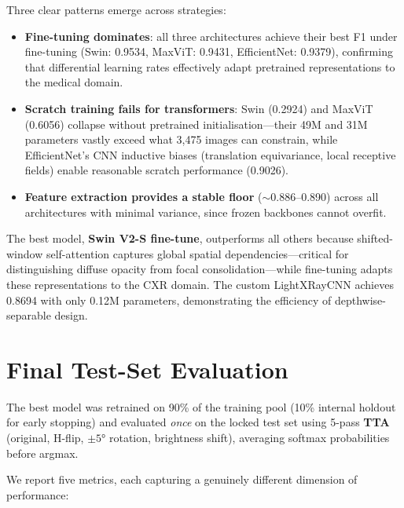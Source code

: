 \documentclass[11pt,a4paper]{article}
\begin{document}
Three clear patterns emerge across strategies:
\begin{itemize}
    \item \textbf{Fine-tuning dominates}: all three architectures achieve their best F1 under fine-tuning (Swin: 0.9534, MaxViT: 0.9431, EfficientNet: 0.9379), confirming that differential learning rates effectively adapt pretrained representations to the medical domain. 
    \item \textbf{Scratch training fails for transformers}: Swin (0.2924) and MaxViT (0.6056) collapse without pretrained initialisation---their 49M and 31M parameters vastly exceed what 3{,}475 images can constrain, while EfficientNet's CNN inductive biases (translation equivariance, local receptive fields) enable reasonable scratch performance (0.9026). 
    \item \textbf{Feature extraction provides a stable floor} ($\sim$0.886--0.890) across all architectures with minimal variance, since frozen backbones cannot overfit.
\end{itemize}

The best model, \textbf{Swin V2-S fine-tune}, outperforms all others because shifted-window self-attention captures global spatial dependencies---critical for distinguishing diffuse opacity from focal consolidation---while fine-tuning adapts these representations to the CXR domain. The custom LightXRayCNN achieves 0.8694 with only 0.12M parameters, demonstrating the efficiency of depthwise-separable design.
\section{Final Test-Set Evaluation}

The best model was retrained on 90\% of the training pool (10\% internal holdout for early stopping) and evaluated \emph{once} on the locked test set using 5-pass \textbf{TTA}~\cite{shiri2024} (original, H-flip, $\pm5°$ rotation, brightness shift), averaging softmax probabilities before argmax.

We report five metrics, each capturing a genuinely different dimension of performance:
\end{document}
